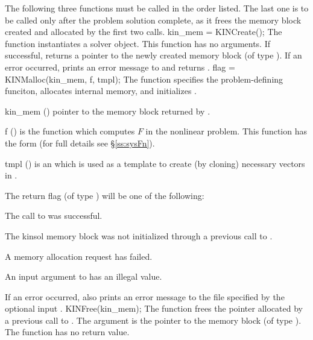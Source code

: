 The following three functions must be called in the order listed. The last one
is to be called only after the problem solution complete, as it frees the
{\kinsol} memory block created and allocated by the first two calls.
{
  kin\_mem = KINCreate();
}
{
  The function  instantiates a {\kinsol} solver object.
}
{
  This function has no arguments.
}
{
  If successful,  returns a pointer to the newly created 
  {\kinsol} memory block (of type ).
  If an error occurred,  prints an error message to 
  and returns .
}
{}
{
flag = KINMalloc(kin\_mem, f, tmpl);
}
{
  The function  specifies the problem-defining
  funciton, allocates internal memory, and initializes {\kinsol}.
}
{
  \begin{args}
  \item[kin\_mem] ()
    pointer to the {\kinsol} memory block returned by .
  \item[f] ()
    is the {\C} function which computes $F$ in the nonlinear problem. 
    This function has the form  
    (for full details see \S\ref{ss:sysFn}).
  \item[tmpl] ()
    is an  which is used as a template to create (by cloning)
    necessary vectors in .
  \end{args}
}
{
  The return flag  (of type ) will be one of the following:
  \begin{args}
  \item[\Id{KIN\_SUCCESS}]
    The call to  was successful.
  \item[\Id{KIN\_MEM\_NULL}] 
    The {kinsol} memory block was not initialized through a previous call
    to .
  \item[\Id{KIN\_MEM\_FAIL}] 
    A memory allocation request has failed.
  \item[\Id{KIN\_ILL\_INPUT}] 
    An input argument to  has an illegal value.
  \end{args}
}
{
  If an error occurred,  also prints an error message to the
  file specified by the optional input .
}
{
  KINFree(kin\_mem);
}
{
  The function  frees the pointer allocated by
  a previous call to .
}
{
  The argument is the pointer to the {\kinsol} memory block (of type ).
}
{
  The function  has no return value.
}
{}

